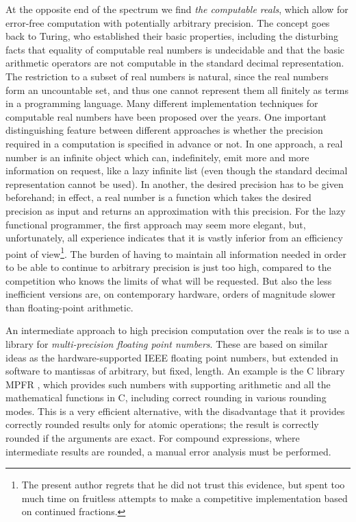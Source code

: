 \documentclass[9pt, a4, twocolumn]{article}
\begin{document}
At the opposite end of the spectrum we find \emph{the computable
reals}, which allow for error-free computation with
potentially arbitrary precision. The concept goes back to Turing, who
established their basic properties, including the disturbing facts that
equality of computable real numbers is undecidable and that the
basic arithmetic operators are not computable in the standard decimal 
representation.  The restriction to a subset of real numbers is natural, since the
real numbers form an uncountable set, and thus one cannot represent
them all finitely as terms in a programming language.
Many different implementation techniques for computable real numbers 
have been proposed over the years. One important distinguishing feature between
different approaches is whether the precision required in a
computation is specified in
advance or not. In one approach, a real number is an infinite object
which can, indefinitely, emit more and more
information on request, like a lazy infinite list (even though the
standard decimal representation cannot be used). In another, the
desired precision has to be given beforehand; in effect, a real number is a
function which takes the desired precision as input and returns an
approximation with this precision. For the lazy functional programmer,
the first approach may seem more elegant, but, unfortunately, all
experience indicates that it is vastly inferior from an efficiency point
of view\footnote{The present author regrets that he did not trust this
evidence, but spent too much time on fruitless attempts to make a
competitive implementation based on continued fractions.}\cite{boehm}. 
The burden of having to maintain all information needed in order to be
able to continue to arbitrary precision is just too high, compared to
the competition who knows the limits of what will be requested. But
also the less inefficient versions are, on contemporary hardware,
orders of magnitude slower than floating-point arithmetic. 

An intermediate approach to high precision computation over the reals is to use a
library for \emph{multi-precision floating point numbers}. These are based
on similar ideas as the hardware-supported IEEE floating point
numbers, but extended in software to mantissas of arbitrary, but
fixed, length. An
example is the C library MPFR \cite{mpfr}, which provides such
numbers with supporting arithmetic and all the mathematical functions
in C, including correct rounding in various rounding modes. This is a
very efficient alternative, with the disadvantage that it provides
correctly rounded results only for atomic operations; the result is
correctly rounded if the arguments are exact. For compound
expressions, where intermediate results are rounded, a manual error
analysis must be performed.
\end{document}
